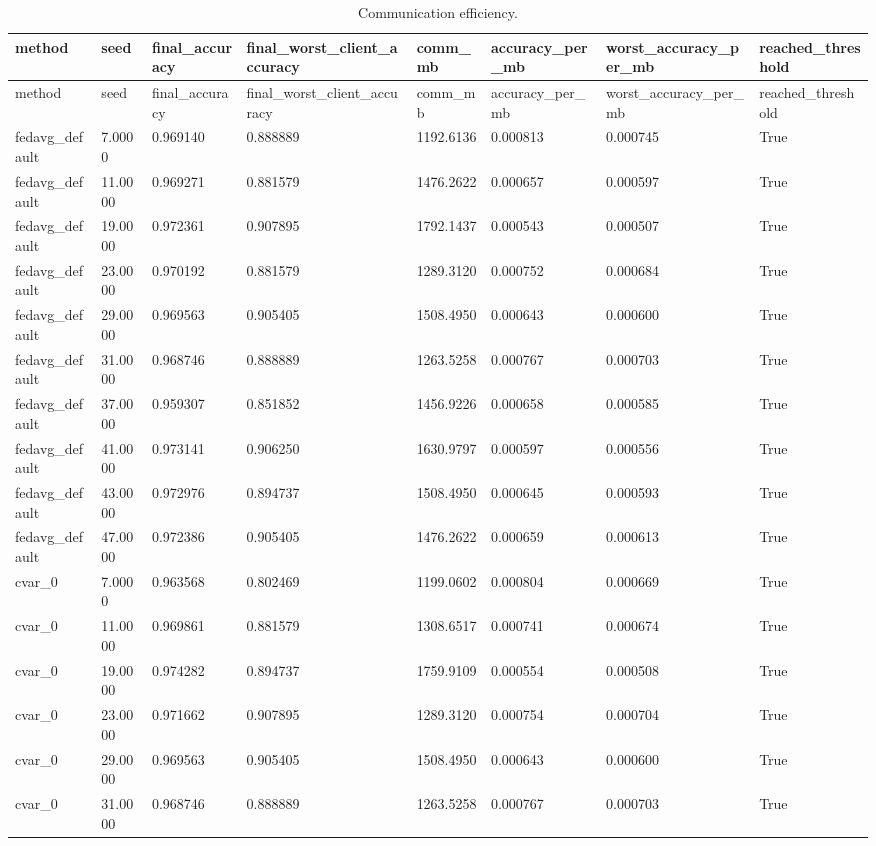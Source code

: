 \documentclass[11pt]{report}
\begin{document}
\begin{longtable}{llllllll}
\caption{Communication efficiency.}\\
\toprule
method & seed & final\_accuracy & final\_worst\_client\_accuracy & comm\_mb & accuracy\_per\_mb & worst\_accuracy\_per\_mb & reached\_threshold \\
\midrule
\endfirsthead
\toprule
method & seed & final\_accuracy & final\_worst\_client\_accuracy & comm\_mb & accuracy\_per\_mb & worst\_accuracy\_per\_mb & reached\_threshold \\
\midrule
\endhead
fedavg\_default & 7.0000 & 0.969140 & 0.888889 & 1192.6136 & 0.000813 & 0.000745 & True \\
fedavg\_default & 11.0000 & 0.969271 & 0.881579 & 1476.2622 & 0.000657 & 0.000597 & True \\
fedavg\_default & 19.0000 & 0.972361 & 0.907895 & 1792.1437 & 0.000543 & 0.000507 & True \\
fedavg\_default & 23.0000 & 0.970192 & 0.881579 & 1289.3120 & 0.000752 & 0.000684 & True \\
fedavg\_default & 29.0000 & 0.969563 & 0.905405 & 1508.4950 & 0.000643 & 0.000600 & True \\
fedavg\_default & 31.0000 & 0.968746 & 0.888889 & 1263.5258 & 0.000767 & 0.000703 & True \\
fedavg\_default & 37.0000 & 0.959307 & 0.851852 & 1456.9226 & 0.000658 & 0.000585 & True \\
fedavg\_default & 41.0000 & 0.973141 & 0.906250 & 1630.9797 & 0.000597 & 0.000556 & True \\
fedavg\_default & 43.0000 & 0.972976 & 0.894737 & 1508.4950 & 0.000645 & 0.000593 & True \\
fedavg\_default & 47.0000 & 0.972386 & 0.905405 & 1476.2622 & 0.000659 & 0.000613 & True \\
cvar\_0 & 7.0000 & 0.963568 & 0.802469 & 1199.0602 & 0.000804 & 0.000669 & True \\
cvar\_0 & 11.0000 & 0.969861 & 0.881579 & 1308.6517 & 0.000741 & 0.000674 & True \\
cvar\_0 & 19.0000 & 0.974282 & 0.894737 & 1759.9109 & 0.000554 & 0.000508 & True \\
cvar\_0 & 23.0000 & 0.971662 & 0.907895 & 1289.3120 & 0.000754 & 0.000704 & True \\
cvar\_0 & 29.0000 & 0.969563 & 0.905405 & 1508.4950 & 0.000643 & 0.000600 & True \\
cvar\_0 & 31.0000 & 0.968746 & 0.888889 & 1263.5258 & 0.000767 & 0.000703 & True \\

\end{longtable}
\end{document}
